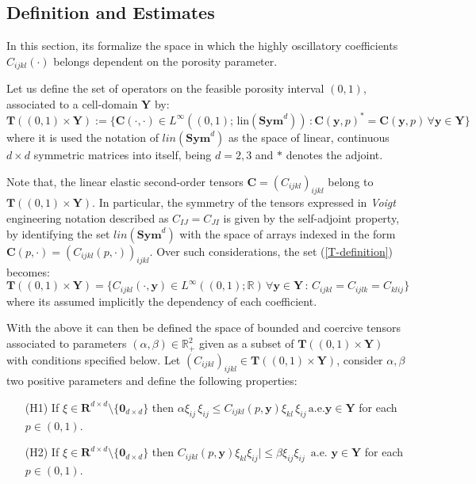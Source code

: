 \subsection{Definition and Estimates}
In this section, its formalize the space in which the highly oscillatory coefficients $C_{ijkl}(\cdot)$ belongs dependent on the porosity parameter.
\begin{defn}
Let us define the set of operators on the feasible porosity interval $(0,1)$, associated to a cell-domain $\mathbf{Y}$ by:
\begin{equation}
    \label{T-definition}
    \mathbf{T}((0,1) \times \mathbf{Y}) := \big \{ \mathbf{C}(\cdot, \cdot) \in L^{\infty}((0,1); \, \text{lin}(\textbf{Sym}^d))\, : \mathbf{C}(\mathbf{y}, p)^* = \mathbf{C}(\mathbf{y}, p) \, \forall \mathbf{y} \in \mathbf{Y}\big \}
\end{equation}
where it is used the notation of $lin(\mathbf{Sym}^d)$ as the space of linear, continuous $d\times d$ symmetric matrices into itself, being $d=2,3$ and $*$ denotes the adjoint. 
\end{defn}
\begin{rem}
Note that, the linear elastic second-order tensors $\mathbf{C} = (C_{ijkl})_{ijkl}$ belong to $\mathbf{T}((0,1)\times \mathbf{Y})$. In particular, the symmetry of the tensors expressed in \textit{Voigt} engineering notation described as $C_{IJ}=C_{JI}$ is given by the self-adjoint property, by identifying the set $lin(\mathbf{Sym}^d)$ with the space of arrays indexed in the form $\mathbf{C}(p, \cdot) = (C_{ijkl} (p, \cdot) )_{ijkl}$.
Over such considerations, the set (\ref{T-definition}) becomes:
\begin{equation*}
    \mathbf{T}((0,1)\times \mathbf{Y}) = \big \{ C_{ijkl}(\cdot, \mathbf{y}) \in L^{\infty}((0,1); \mathbb{R})  \, \forall \mathbf{y} \in \mathbf{Y}\,:\, C_{ijkl} = C_{ijlk} = C_{klij} \big \}
\end{equation*}
where its assumed implicitly the dependency of each coefficient.
\end{rem}
With the above it can then be defined the space of bounded and coercive tensors associated to parameters $(\alpha,\beta) \in \mathbb{R}^2_+$ given as a subset of $\mathbf{T}((0,1)\times \mathbf{Y})$ with conditions specified below.
Let $(C_{ijkl})_{ijkl} \in \mathbf{T}((0,1)\times \mathbf{Y})$, consider $\alpha, \beta$ two positive parameters and define the following properties:
\begin{enumerate}
    \item[(H1)] If $\xi \in \mathbf{R}^{d\times d} \setminus \{\mathbf{0}_{d \times d}\}$ then $\alpha \xi_{ij} \, \xi_{ij} \leq C_{ijkl}(p,\mathbf{y})  \xi_{kl}\,\xi_{ij}\, \text{a.e.} \mathbf{y} \in \mathbf{Y}$ for each $p \in (0,1)$.
    \item[(H2)] If $\xi \in \mathbf{R}^{d\times d} \setminus \{\mathbf{0}_{d \times d}\}$ then $C_{ijkl}(p,\mathbf{y}) \xi_{kl} \xi_{ij} \vert \leq \beta  \xi_{ij} \xi_{ij} \, \text{ a.e. }\mathbf{y} \in \mathbf{Y}$ for each $p \in (0,1)$.
\end{enumerate}
